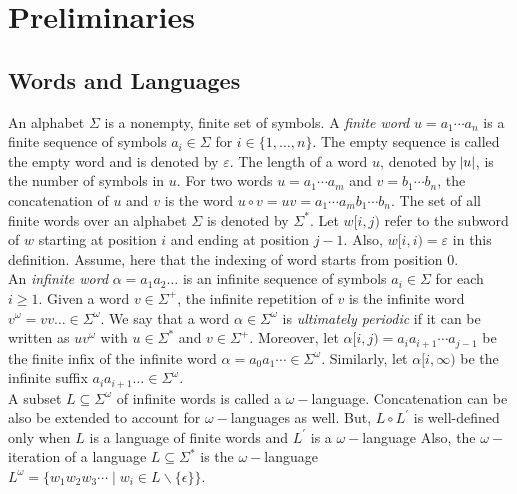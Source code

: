 \chapter{Preliminaries}

\section{Words and Languages}
An alphabet $\Sigma$ is a nonempty, finite set of symbols. A \emph{finite word} $u = a_1 \cdots a_n$ is a finite
sequence of symbols $a_i \in\Sigma$ for $i \in \{1,\ldots,n\}$. The empty sequence is called the empty
word and is denoted by $\varepsilon$. The length of a word $u$, denoted by $\abs{u}$, is the number of
symbols in $u$. 
For two words $u = a_1\cdots a_m$ and $v = b_1\cdots b_n$, the concatenation of $u$ and $v$ is the word
$u \circ v = uv = a_1\cdots {a_m} {b_1} \cdots b_n$. 
The set of all finite words over an alphabet $\Sigma$ is denoted by $\Sigma^*$. Let $w[i,j)$ refer to the subword of $w$ starting at position $i$ and ending at position $j-1$. Also, $w[i,i)=\varepsilon$ in this definition. Assume, here that the indexing of word starts from position $0$.\\

An \emph{infinite word} $\alpha = a_1 a_2 \ldots$ is an infinite sequence  of symbols $a_i \in \Sigma$ for each $i \geq 1$. Given a word $v \in \Sigma^+$, the infinite repetition of $v$ is the infinite word $v^\omega = v v \ldots \in \Sigma^\omega$.  We say that a word $\alpha \in \Sigma^\omega$ is \emph{ultimately periodic} if it can be written as $uv^\omega$ with $u \in \Sigma^\ast$ and $v \in \Sigma^+$. Moreover, let $\alpha[i, j)=a_ia_{i+1}\cdots a_{j-1}$ be the finite infix of the infinite word $\alpha= a_0a_{1}\cdots \in \Sigma^\omega$. Similarly, let $\alpha[i,\infty)$ be the infinite suffix $a_i a_{i+1} \ldots \in \Sigma^\omega$.
\\

 A subset $L\subseteq \Sigma^\omega$ of infinite words is called a $\omega-$language. Concatenation can be also be extended to account for $\omega-$languages as well. But, $L\circ L^\prime$ is well-defined only when $L$ is a language of finite words and $L^\prime$ is a $\omega-$language 
Also, the $\omega-$iteration of a language $L\subseteq\Sigma^{*}$ is the $\omega-$language $L^{\omega}=\{w_1w_2w_3\cdots \mid w_i\in L\backslash\{\epsilon\}\}$.


